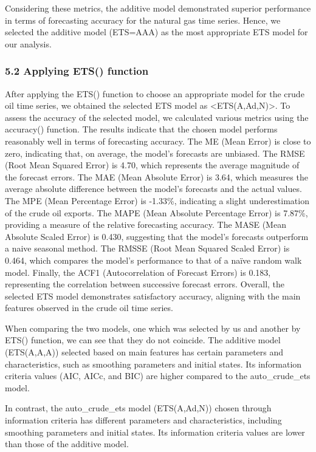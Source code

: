 \documentclass[
]{article}
\begin{document}
Considering these metrics, the additive model demonstrated superior
performance in terms of forecasting accuracy for the natural gas time
series. Hence, we selected the additive model (ETS=AAA) as the most
appropriate ETS model for our analysis.

\hypertarget{applying-ets-function}{%
\subsubsection{5.2 Applying ETS()
function}\label{applying-ets-function}}

After applying the ETS() function to choose an appropriate model for the
crude oil time series, we obtained the selected ETS model as
\textless ETS(A,Ad,N)\textgreater. To assess the accuracy of the
selected model, we calculated various metrics using the accuracy()
function. The results indicate that the chosen model performs reasonably
well in terms of forecasting accuracy. The ME (Mean Error) is close to
zero, indicating that, on average, the model's forecasts are unbiased.
The RMSE (Root Mean Squared Error) is 4.70, which represents the average
magnitude of the forecast errors. The MAE (Mean Absolute Error) is 3.64,
which measures the average absolute difference between the model's
forecasts and the actual values. The MPE (Mean Percentage Error) is
-1.33\%, indicating a slight underestimation of the crude oil exports.
The MAPE (Mean Absolute Percentage Error) is 7.87\%, providing a measure
of the relative forecasting accuracy. The MASE (Mean Absolute Scaled
Error) is 0.430, suggesting that the model's forecasts outperform a
naive seasonal method. The RMSSE (Root Mean Squared Scaled Error) is
0.464, which compares the model's performance to that of a naïve random
walk model. Finally, the ACF1 (Autocorrelation of Forecast Errors) is
0.183, representing the correlation between successive forecast errors.
Overall, the selected ETS model demonstrates satisfactory accuracy,
aligning with the main features observed in the crude oil time series.

When comparing the two models, one which was selected by us and another
by ETS() function, we can see that they do not coincide. The additive
model (ETS(A,A,A)) selected based on main features has certain
parameters and characteristics, such as smoothing parameters and initial
states. Its information criteria values (AIC, AICc, and BIC) are higher
compared to the auto\_crude\_ets model.

In contrast, the auto\_crude\_ets model (ETS(A,Ad,N)) chosen through
information criteria has different parameters and characteristics,
including smoothing parameters and initial states. Its information
criteria values are lower than those of the additive model.
\end{document}
